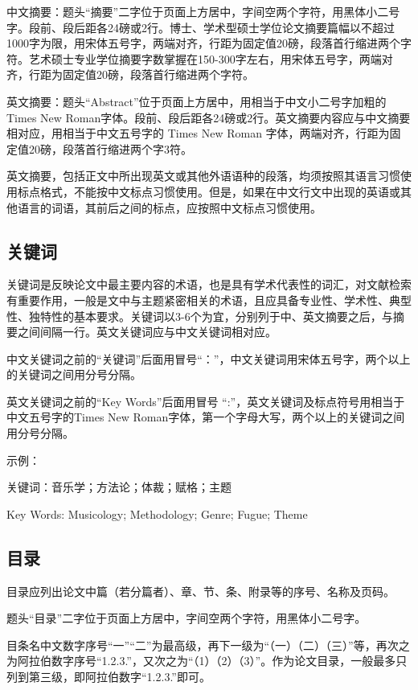 中文摘要：题头“摘要”二字位于页面上方居中，字间空两个字符，用黑体小二号字。段前、段后距各24磅或2行。博士、学术型硕士学位论文摘要篇幅以不超过1000字为限，用宋体五号字，两端对齐，行距为固定值20磅，段落首行缩进两个字符。艺术硕士专业学位摘要字数掌握在150-300字左右，用宋体五号字，两端对齐，行距为固定值20磅，段落首行缩进两个字符。

英文摘要：题头“Abstract”位于页面上方居中，用相当于中文小二号字加粗的Times New Roman字体。段前、段后距各24磅或2行。英文摘要内容应与中文摘要相对应，用相当于中文五号字的 Times New Roman 字体，两端对齐，行距为固定值20磅，段落首行缩进两个字3符。

英文摘要，包括正文中所出现英文或其他外语语种的段落，均须按照其语言习惯使用标点格式，不能按中文标点习惯使用。但是，如果在中文行文中出现的英语或其他语言的词语，其前后之间的标点，应按照中文标点习惯使用。

\subsection{关键词}

关键词是反映论文中最主要内容的术语，也是具有学术代表性的词汇，对文献检索有重要作用，一般是文中与主题紧密相关的术语，且应具备专业性、学术性、典型性、独特性的基本要求。关键词以3-6个为宜，分别列于中、英文摘要之后，与摘要之间间隔一行。英文关键词应与中文关键词相对应。

中文关键词之前的“关键词”后面用冒号“：”，中文关键词用宋体五号字，两个以上的关键词之间用分号分隔。

英文关键词之前的“Key Words”后面用冒号 “:”，英文关键词及标点符号用相当于中文五号字的Times New Roman字体，第一个字母大写，两个以上的关键词之间用分号分隔。

示例：

关键词：音乐学；方法论；体裁；赋格；主题

Key Words: Musicology; Methodology; Genre; Fugue; Theme

\subsection{目录}

目录应列出论文中篇（若分篇者）、章、节、条、附录等的序号、名称及页码。

题头“目录”二字位于页面上方居中，字间空两个字符，用黑体小二号字。

目条名中文数字序号“一”“二”为最高级，再下一级为“（一）（二）（三）”等，再次之为阿拉伯数字序号“1.2.3.”，又次之为“（1）（2）（3）”。作为论文目录，一般最多只列到第三级，即阿拉伯数字“1.2.3.”即可。

